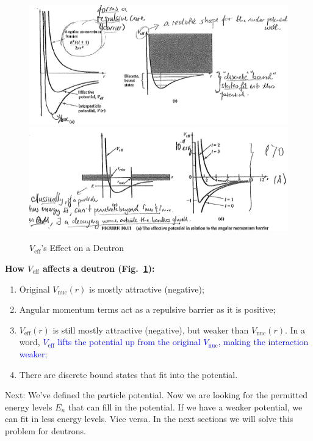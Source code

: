 \documentclass{school-22.101-notes}
\begin{document}
\clearpage
\begin{figure}
    \centering
    \includegraphics[width=5in]{images/deuteron/deutrium-V-eff.png}
    \\
    \includegraphics[width=5.5in]{images/deuteron/deutrium-V-eff-2.png}    
    \caption{$V_{\mathrm{eff}}$'s Effect on a Deutron}
    \label{V-eff}
\end{figure}
\textbf{How $V_{\mathrm{eff}}$ affects a deutron (Fig.~\ref{V-eff}):}
\begin{enumerate}
\item Original $V_{\mathrm{nuc}} (r)$ is mostly attractive (negative); 
\item Angular momentum terms act as a repulsive barrier as it is positive;
\item $V_{\mathrm{eff}} (r)$ is still mostly attractive (negative), but weaker than $V_{\mathrm{nuc}} (r)$. In a word, \textcolor{blue}{$V_{\mathrm{eff}}$ lifts the potential up from the original $V_{\mathrm{nuc}}$, making the interaction weaker;} 
\item There are discrete bound states that fit into the potential. 
\end{enumerate}

Next: We've defined the particle potential. Now we are looking for the permitted energy levels $E_n$ that can fill in the potential. If we have a weaker potential, we can fit in less energy levels. Vice versa. In the next sections we will solve this problem for deutrons. 
\end{document}

